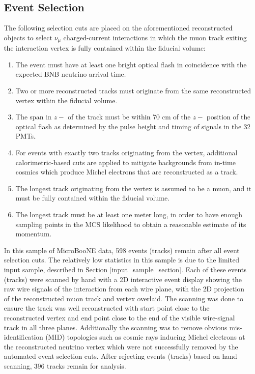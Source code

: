 \documentclass[a4paper,11pt]{article}
\begin{document}
\subsection{Event Selection}
The following selection cuts are placed on the aforementioned reconstructed objects to select $\nu_\mu$ charged-current interactions in which the muon track exiting the interaction vertex is fully contained within the fiducial volume:
\begin{enumerate}
\item The event must have at least one bright optical flash in coincidence with the expected BNB neutrino arrival time.
\item Two or more reconstructed tracks must originate from the same reconstructed vertex within the fiducial volume.
\item The span in $z-$ of the track must be within 70 cm of the $z-$ position of the optical flash as determined by the pulse height and timing of signals in the 32 PMTs.
\item For events with exactly two tracks originating from the vertex, additional calorimetric-based cuts are applied to mitigate backgrounds from in-time cosmics which produce Michel electrons that are reconstructed as a track.
\item The longest track originating from the vertex is assumed to be a muon, and it must be fully contained within the fiducial volume.
\item The longest track must be at least one meter long, in order to have enough sampling points in the MCS likelihood to obtain a reasonable estimate of its momentum.
\end{enumerate}

In this sample of MicroBooNE data, 598 events (tracks) remain after all event selection cuts. The relatively low statistics in this sample is due to the limited input sample, described in Section \ref{input_sample_section}. Each of these events (tracks) were scanned by hand with a 2D interactive event display showing the raw wire signals of the interaction from each wire plane, with the 2D projection of the reconstructed muon track and vertex overlaid. The scanning was done to ensure the track was well reconstructed with start point close to the reconstructed vertex and end point close to the end of the visible wire-signal track in all three planes. Additionally the scanning was to remove obvious mis-identification (MID) topologies such as cosmic rays inducing Michel electrons at the reconstructed neutrino vertex which were not successfully removed by the automated event selection cuts. After rejecting events (tracks) based on hand scanning, 396 tracks remain for analysis.
\end{document}
